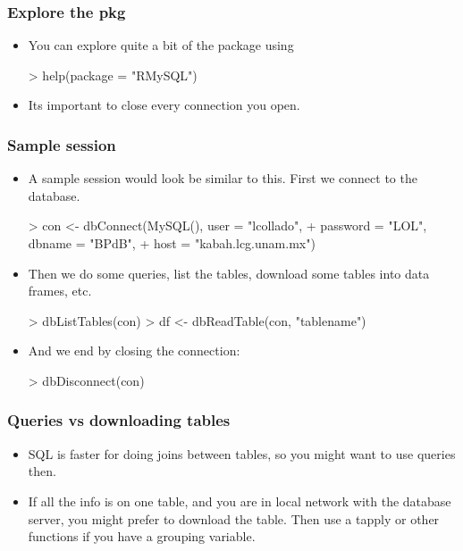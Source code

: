 \begin{frame}
  \frametitle{Explore the pkg}
  \begin{itemize}
  \item You can explore quite a bit of the package using
\begin{Schunk}
\begin{Sinput}
> help(package = "RMySQL")
\end{Sinput}
\end{Schunk}
  \item Its \alert{important} to close every connection you open.
  \end{itemize}
\end{frame}

\begin{frame}
  \frametitle{Sample session}
  \begin{itemize}
  \item A sample session would look be similar to this. First we connect to the database.
\begin{Schunk}
\begin{Sinput}
> con <- dbConnect(MySQL(), user = "lcollado", 
+     password = "LOL", dbname = "BPdB", 
+     host = "kabah.lcg.unam.mx")
\end{Sinput}
\end{Schunk}
  \item Then we do some queries, list the tables, download some tables into data frames, etc.
\begin{Schunk}
\begin{Sinput}
> dbListTables(con)
> df <- dbReadTable(con, "tablename")
\end{Sinput}
\end{Schunk}
  \item And we end by closing the connection:
\begin{Schunk}
\begin{Sinput}
> dbDisconnect(con)
\end{Sinput}
\end{Schunk}
  \end{itemize}
\end{frame}

\begin{frame}[allowframebreaks]
  \frametitle{Queries vs downloading tables}
  \begin{itemize}
  \item SQL is faster for doing joins between tables, so you might want to use queries then.
  \item If all the info is on one table, and you are in local network with the database server, you might prefer to download the table. Then use a tapply or other functions if you have a grouping variable.
  \end{itemize}
\end{frame}

